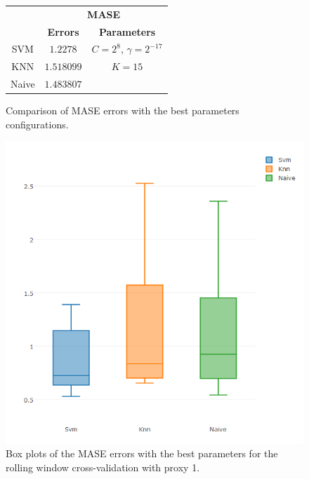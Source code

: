 \begin{figure}[!h]
\centering
\begin{tabular}{|c|c|c|}
   \hline
   & \multicolumn{2}{|c|}{\textbf{MASE}} \\ \cline{2-3}
   & \textbf{Errors} & \textbf{Parameters}          \\ \hline
   SVM  & $1.2278$        & $C = 2^8$, $\gamma = 2^{-17}$          \\ 
   KNN & $1.518099$ & $K = 15$ \\ 
   Naive & $1.483807$ &      \\ 
   \hline
   \end{tabular}
\caption{Comparison of MASE errors with the best parameters configurations.}
\label{fig:table6mMASEp1}
\centering
\includegraphics[width=\linewidth]{img/6mproxy1MASE.png}
\caption{Box plots of the MASE errors with the best parameters for the rolling window cross-validation with proxy 1.}
\end{figure}
